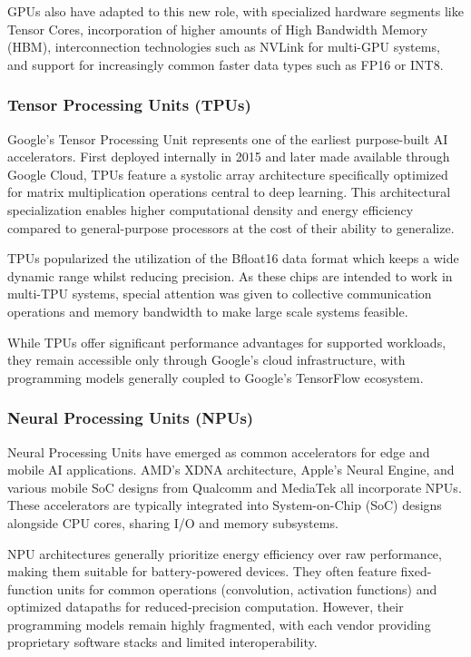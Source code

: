 \documentclass[manuscript,screen,review,format=acmsmall]{acmart}
\begin{document}
GPUs also have adapted to this new role, with specialized hardware segments like Tensor Cores, incorporation of higher amounts of High Bandwidth Memory (HBM), interconnection technologies such as NVLink for multi-GPU systems, and support for increasingly common faster data types such as FP16 or INT8\cite{MicikeviciusPaulius2018MPT}.

\subsubsection{Tensor Processing Units (TPUs)}

Google's Tensor Processing Unit represents one of the earliest purpose-built AI accelerators. First deployed internally in 2015 and later made available through Google Cloud, TPUs feature a systolic array architecture specifically optimized for matrix multiplication operations central to deep learning. This architectural specialization enables higher computational density and energy efficiency compared to general-purpose processors at the cost of their ability to generalize.

TPUs popularized the utilization of the Bfloat16 data format which keeps a wide dynamic range whilst reducing precision. As these chips are intended to work in multi-TPU systems, special attention was given to collective communication operations and memory bandwidth to make large scale systems feasible.

While TPUs offer significant performance advantages for supported workloads, they remain accessible only through Google's cloud infrastructure, with programming models generally coupled to Google's TensorFlow ecosystem.

\subsubsection{Neural Processing Units (NPUs)}

Neural Processing Units have emerged as common accelerators for edge and mobile AI applications. AMD's XDNA architecture, Apple's Neural Engine, and various mobile SoC designs from Qualcomm and MediaTek all incorporate NPUs. These accelerators are typically integrated into System-on-Chip (SoC) designs alongside CPU cores, sharing I/O and memory subsystems. 

NPU architectures generally prioritize energy efficiency over raw performance, making them suitable for battery-powered devices. They often feature fixed-function units for common operations (convolution, activation functions) and optimized datapaths for reduced-precision computation. However, their programming models remain highly fragmented, with each vendor providing proprietary software stacks and limited interoperability.
\end{document}
